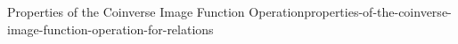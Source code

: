 \begin{proposition}{Properties of the Coinverse Image Function Operation}{properties-of-the-coinverse-image-function-operation-for-relations}
\begin{enumerate}
\begin{webcompile}
                \quad
            \end{webcompile}
    \end{enumerate}
\end{proposition}
